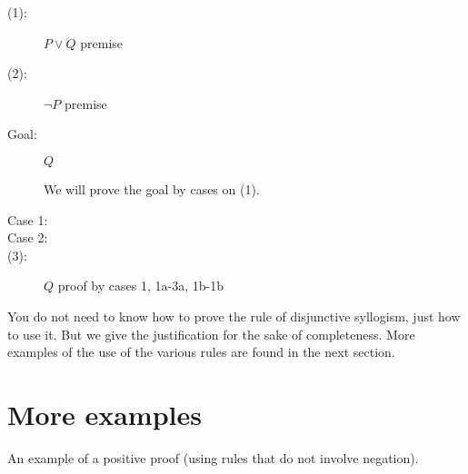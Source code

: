\documentclass[12pt]{article}
\begin{document}
\begin{description}

\item[(1):]  $P \vee Q$  premise

\item[(2):]  $\neg P$ premise

\item[Goal:]  $Q$

We will prove the goal by cases on (1).

\item[Case 1:]  


\item[Case 2:]


\item[(3):] $Q$ proof by cases 1, 1a-3a, 1b-1b


\end{description}

You do not need to know how to prove the rule of disjunctive syllogism, just how to use it.  But we give the justification for the sake of completeness.  More examples of the use of the various rules are found in the next section.

\section{More examples}
An example of a positive proof (using rules that do not involve negation).
\end{document}

